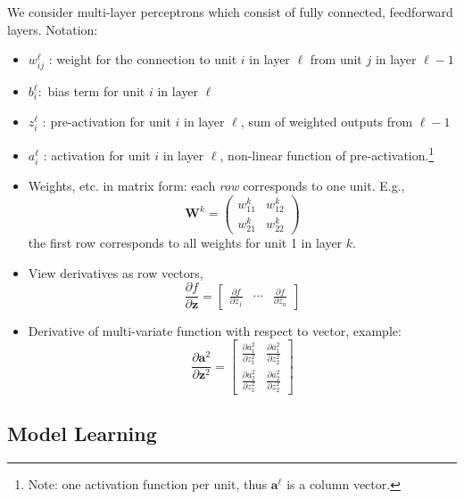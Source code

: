 \documentclass[11pt, %
	oneside, %
	english, %
	onehalfspacing, %
	parskip, %
	]{article} %
\theoremstyle{definition}
\begin{document}
We consider multi-layer perceptrons which consist of fully connected, feedforward layers. Notation:
\begin{itemize}
	\item $w_{i j}^{\ell}$ : weight for the connection to unit $i$ in layer $\ell$ from unit $j$ in layer $\ell-1$
	\item $b_i^{\ell}:$ bias term for unit $i$ in layer $\ell$
	\item $z_i^{\ell}$ : pre-activation for unit $i$ in layer $\ell$, sum of weighted outputs from $\ell-1$
	\item $a_i^{\ell}$ : activation for unit $i$ in layer $\ell$, non-linear function of pre-activation.\footnote{Note: one activation function per unit, thus $\mathbf{a}^\ell$ is a column vector.}
	\item Weights, etc. in matrix form: each \emph{row} corresponds to one unit. E.g.,
	\begin{equation*}
		\mathbf{W}^k =
		\begin{pmatrix}
			w_{11}^k & w_{12}^k \\
			w_{21}^k & w_{22}^k
		\end{pmatrix}
	\end{equation*}
	the first row corresponds to all weights for unit 1 in layer $k$.
	\item View derivatives as row vectors,
	\begin{equation*}
		\frac{\partial f}{\partial \mathbf{z}}=\left[\begin{array}{lll}
			\frac{\partial f}{\partial z_1} & \cdots & \frac{\partial f}{\partial z_n}
			\end{array}\right]
	\end{equation*}
	\item Derivative of multi-variate function with respect to vector, example:
	\begin{equation*}
		\frac{\partial \mathbf{a}^2}{\partial \mathbf{z}^2}=\left[\begin{array}{ll}
			\frac{\partial a_1^2}{\partial z_1^2} & \frac{\partial a_1^2}{\partial z_2^2} \\
			\frac{\partial a_2^2}{\partial z_1^2} & \frac{\partial a_2^2}{\partial z_2^2}
			\end{array}\right]
	\end{equation*}

\end{itemize}

\subsection{Model Learning}
\end{document}
